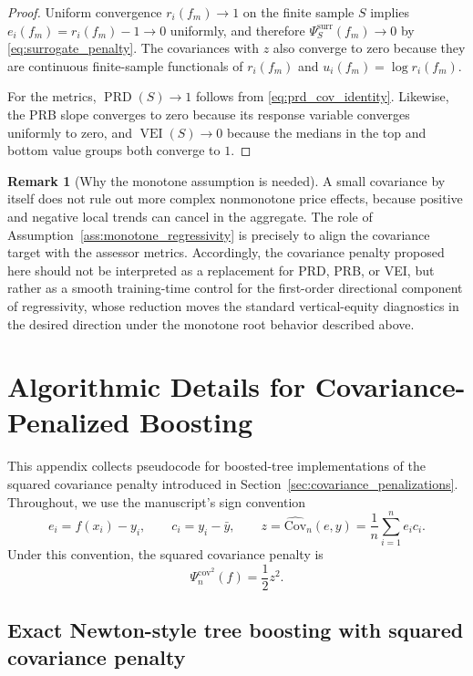 \documentclass[12pt, draft]{article}
\theoremstyle{plain}
\theoremstyle{definition}
\newtheorem{remark}{Remark}
\newcommand{\1}{\mathbf{1}}
\newcommand{\Cov}{\text{Cov}}
\begin{document}
\begin{proof}
Uniform convergence $r_i(f_m)\to 1$ on the finite sample $S$ implies $e_i(f_m)=r_i(f_m)-1\to 0$ uniformly, and therefore $\Psi_S^{\mathrm{surr}}(f_m)\to 0$ by \eqref{eq:surrogate_penalty}. The covariances with $z$ also converge to zero because they are continuous finite-sample functionals of $r_i(f_m)$ and $u_i(f_m)=\log r_i(f_m)$.

For the metrics, $\operatorname{PRD}(S)\to 1$ follows from \eqref{eq:prd_cov_identity}. Likewise, the PRB slope converges to zero because its response variable converges uniformly to zero, and $\operatorname{VEI}(S)\to 0$ because the medians in the top and bottom value groups both converge to $1$.
\end{proof}

\begin{remark}[Why the monotone assumption is needed]
\label{rem:cov_not_sufficient}
A small covariance by itself does not rule out more complex nonmonotone price effects, because positive and negative local trends can cancel in the aggregate. The role of Assumption~\ref{ass:monotone_regressivity} is precisely to align the covariance target with the assessor metrics. Accordingly, the covariance penalty proposed here should not be interpreted as a replacement for PRD, PRB, or VEI, but rather as a smooth training-time control for the first-order directional component of regressivity, whose reduction moves the standard vertical-equity diagnostics in the desired direction under the monotone root behavior described above.
\end{remark}

\section{Algorithmic Details for Covariance-Penalized Boosting}
\label{app:boosting_algorithms}

This appendix collects pseudocode for boosted-tree implementations of the squared covariance penalty introduced in Section~\ref{sec:covariance_penalizations}. Throughout, we use the manuscript's sign convention
\[
e_i = f(x_i)-y_i,
\qquad
c_i = y_i-\bar y,
\qquad
z = \widehat{\Cov}_n(e,y)=\frac{1}{n}\sum_{i=1}^n e_i c_i.
\]
Under this convention, the squared covariance penalty is
\[
\Psi_n^{\mathrm{cov}^2}(f)=\frac{1}{2}z^2.
\]

\subsection{Exact Newton-style tree boosting with squared covariance penalty}
\label{app:exact_newton_cov_boosting}
\end{document}
